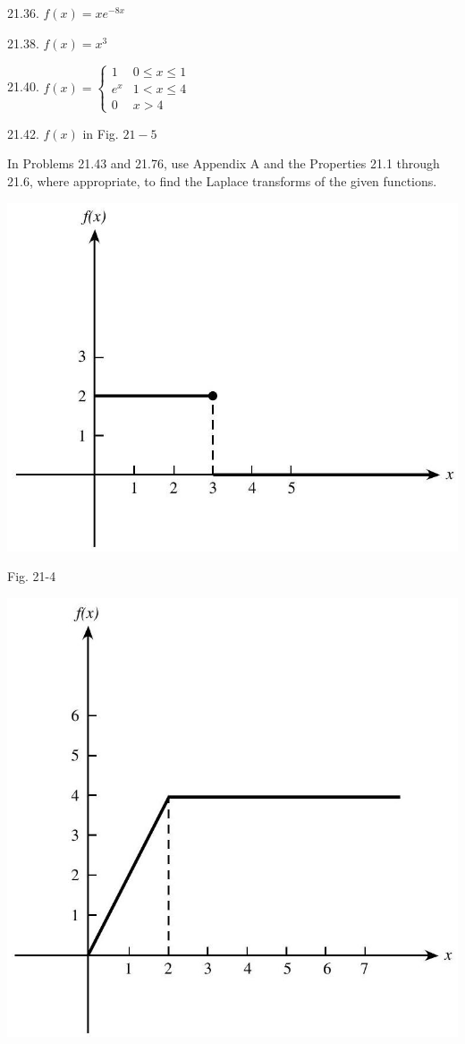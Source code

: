 \documentclass[10pt]{article}
\begin{document}
21.36. $f(x)=x e^{-8 x}$

21.38. $f(x)=x^{3}$

21.40. $f(x)=\left\{\begin{array}{rr}1 & 0 \leq x \leq 1 \\ e^{x} & 1<x \leq 4 \\ 0 & x>4\end{array}\right.$

21.42. $f(x)$ in Fig. $21-5$

In Problems 21.43 and 21.76, use Appendix A and the Properties 21.1 through 21.6, where appropriate, to find the Laplace transforms of the given functions.

\begin{center}
\includegraphics[max width=\textwidth]{2024_04_03_5bb5b4275a64cb9887d1g-239}
\end{center}

Fig. 21-4

\begin{center}
\includegraphics[max width=\textwidth]{2024_04_03_5bb5b4275a64cb9887d1g-240}
\end{center}
\end{document}
